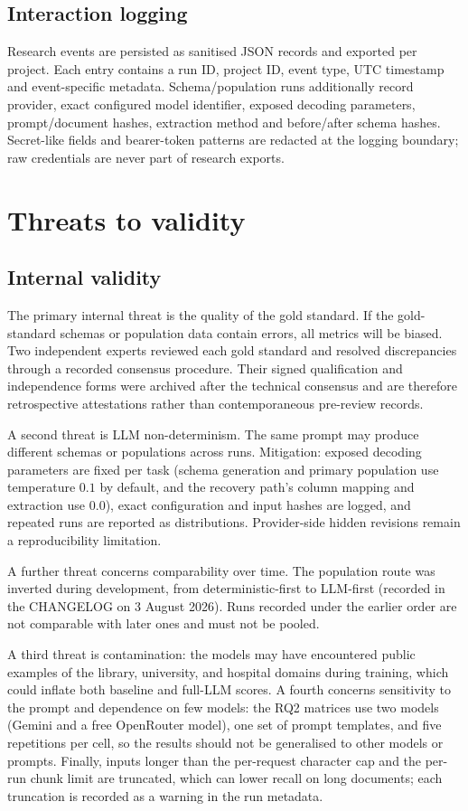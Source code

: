 \documentclass[11pt,a4paper]{article}
\begin{document}
\subsection{Interaction logging}
Research events are persisted as sanitised JSON records and exported per project. Each entry contains a run ID, project ID, event type, UTC timestamp and event-specific metadata. Schema/population runs additionally record provider, exact configured model identifier, exposed decoding parameters, prompt/document hashes, extraction method and before/after schema hashes. Secret-like fields and bearer-token patterns are redacted at the logging boundary; raw credentials are never part of research exports.

\section{Threats to validity}
\label{sec:threats}

\subsection{Internal validity}
The primary internal threat is the quality of the gold standard. If the gold-standard schemas or population data contain errors, all metrics will be biased. Two independent experts reviewed each gold standard and resolved discrepancies through a recorded consensus procedure. Their signed qualification and independence forms were archived after the technical consensus and are therefore retrospective attestations rather than contemporaneous pre-review records.

A second threat is LLM non-determinism. The same prompt may produce different schemas or populations across runs. Mitigation: exposed decoding parameters are fixed per task (schema generation and primary population use temperature $0.1$ by default, and the recovery path's column mapping and extraction use $0.0$), exact configuration and input hashes are logged, and repeated runs are reported as distributions. Provider-side hidden revisions remain a reproducibility limitation.

A further threat concerns comparability over time. The population route was inverted during development, from deterministic-first to LLM-first (recorded in the CHANGELOG on 3 August 2026). Runs recorded under the earlier order are not comparable with later ones and must not be pooled.

A third threat is contamination: the models may have encountered public examples of the library, university, and hospital domains during training, which could inflate both baseline and full-LLM scores. A fourth concerns sensitivity to the prompt and dependence on few models: the RQ2 matrices use two models (Gemini and a free OpenRouter model), one set of prompt templates, and five repetitions per cell, so the results should not be generalised to other models or prompts. Finally, inputs longer than the per-request character cap and the per-run chunk limit are truncated, which can lower recall on long documents; each truncation is recorded as a warning in the run metadata.
\end{document}
